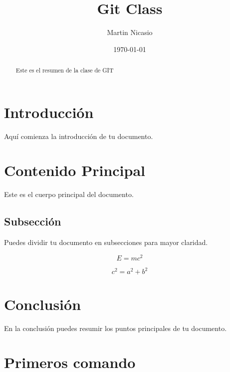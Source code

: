 \documentclass[a4paper,12pt]{article}
\title{Git Class}
\author{Martin Nicasio}
\date{\today}
\begin{document}
\maketitle

\begin{abstract}
Este es el resumen de la clase de GIT
\end{abstract}

\section{Introducción}
Aquí comienza la introducción de tu documento.

\section{Contenido Principal}
Este es el cuerpo principal del documento.

\subsection{Subsección}
Puedes dividir tu documento en subsecciones para mayor claridad.

\begin{equation}
E = mc^2
\end{equation}

\begin{equation}
    c^2 = a^2 + b^2
\end{equation}

\section{Conclusión}
En la conclusión puedes resumir los puntos principales de tu documento.

\newpage
\section{Primeros comando}
\end{document}
